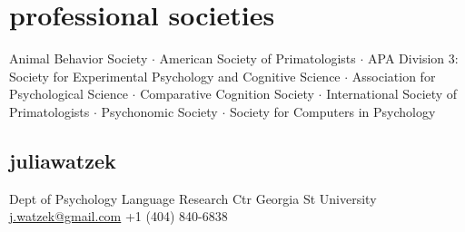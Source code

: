 \documentclass[]{friggeri-cv}
\begin{document}
\section{professional societies}

    Animal Behavior Society $\cdot$ %
    American Society of Primatologists $\cdot$ %
    APA Division 3: Society for Experimental Psychology and Cognitive Science $\cdot$ %
    Association for Psychological Science $\cdot$ %
    Comparative Cognition Society $\cdot$ %
    International Society of Primatologists $\cdot$ %
    Psychonomic Society $\cdot$ %
    Society for Computers in Psychology\\[-.1cm]


\begin{aside}
  \section{{\normalfont julia}watzek}
    Dept of Psychology
    Language Research Ctr
    Georgia St University
    ~
    \href{mailto:j.watzek@gmail.com}{j.watzek@gmail.com}
    +1 (404) 840-6838
\end{aside}
\end{document}
